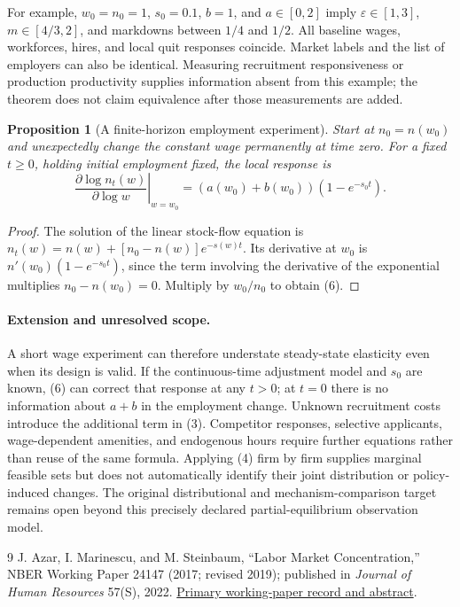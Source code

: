\documentclass[11pt]{article}
\newtheorem{proposition}[theorem]{Proposition}
\theoremstyle{definition}
\begin{document}
For example, $w_0=n_0=1$, $s_0=0.1$, $b=1$, and $a\in[0,2]$ imply $\varepsilon\in[1,3]$, $m\in[4/3,2]$, and markdowns between $1/4$ and $1/2$. All baseline wages, workforces, hires, and local quit responses coincide. Market labels and the list of employers can also be identical. Measuring recruitment responsiveness or production productivity supplies information absent from this example; the theorem does not claim equivalence after those measurements are added.

\begin{proposition}[A finite-horizon employment experiment]
Start at $n_0=n(w_0)$ and unexpectedly change the constant wage permanently at time zero. For a fixed $t\geq0$, holding initial employment fixed, the local response is
\[
 \left.\frac{\partial\log n_t(w)}{\partial\log w}\right|_{w=w_0}
 =(a(w_0)+b(w_0))(1-e^{-s_0t}).
 \tag{6}
\]
\end{proposition}
\begin{proof}
The solution of the linear stock-flow equation is
$n_t(w)=n(w)+[n_0-n(w)]e^{-s(w)t}$. Its derivative at $w_0$ is $n'(w_0)(1-e^{-s_0t})$, since the term involving the derivative of the exponential multiplies $n_0-n(w_0)=0$. Multiply by $w_0/n_0$ to obtain (6).
\end{proof}

\paragraph{Extension and unresolved scope.}
A short wage experiment can therefore understate steady-state elasticity even when its design is valid. If the continuous-time adjustment model and $s_0$ are known, (6) can correct that response at any $t>0$; at $t=0$ there is no information about $a+b$ in the employment change. Unknown recruitment costs introduce the additional term in (3). Competitor responses, selective applicants, wage-dependent amenities, and endogenous hours require further equations rather than reuse of the same formula. Applying (4) firm by firm supplies marginal feasible sets but does not automatically identify their joint distribution or policy-induced changes. The original distributional and mechanism-comparison target remains open beyond this precisely declared partial-equilibrium observation model.

\begin{thebibliography}{9}
 J. Azar, I. Marinescu, and M. Steinbaum, ``Labor Market Concentration,'' NBER Working Paper 24147 (2017; revised 2019); published in \emph{Journal of Human Resources} 57(S), 2022. \href{https://www.nber.org/papers/w24147}{Primary working-paper record and abstract}.
\end{thebibliography}
\end{document}

